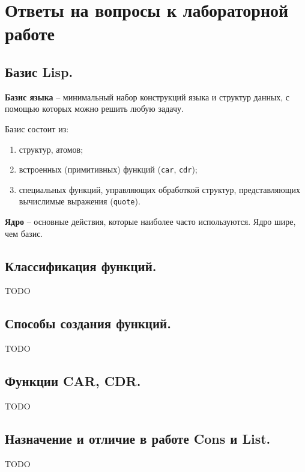 \chapter{Ответы на вопросы к лабораторной работе}

\section{Базис Lisp.}

\textbf{Базис языка} -- минимальный набор конструкций языка и структур данных, с помощью которых можно решить любую задачу.

Базис состоит из:
\begin{enumerate}
    \item структур, атомов;
    \item встроенных (примитивных) функций (\texttt{car}, \texttt{cdr});
    \item специальных функций, управляющих обработкой структур, представляющих вычислимые выражения (\texttt{quote}).
\end{enumerate}

\textbf{Ядро} -- основные действия, которые наиболее часто используются. Ядро шире, чем базис.


\section{Классификация функций.}

TODO

\section{Способы создания функций.}

TODO

\section{Функции CAR, CDR.}

TODO

\section{Назначение и отличие в работе Cons и List.}

TODO
